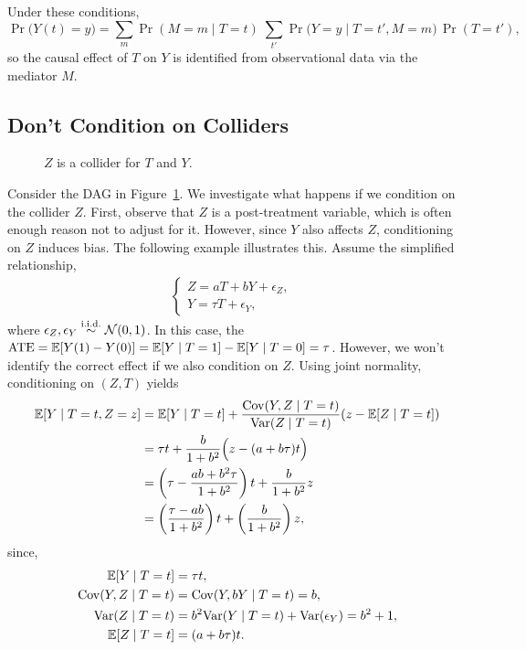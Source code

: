 \documentclass[11pt]{exam}
\begin{document}
Under these conditions,
\[
 \Pr\big(Y(t)=y\big)
= \sum_{m}  \Pr(M = m \mid T = t)\;\sum_{t'}  \Pr\big(Y = y \mid T = t', M = m\big)\, \Pr(T = t'),
\]
so the causal effect of $T$ on $Y$ is identified from observational data via the mediator $M$.

\subsection{Don't Condition on Colliders}

\begin{figure}[h!]
\centering
{}
\caption{$Z$ is a collider for $T$ and $Y$.}
\label{fig:collider}
\end{figure}

Consider the DAG in Figure~\ref{fig:collider}. We investigate what happens if we condition on the collider $Z$. First, observe that $Z$ is a post-treatment variable, which is often enough reason not to adjust for it. However, since $Y$ also affects $Z$, conditioning on $Z$ induces bias. The following example illustrates this. Assume the simplified relationship,
\begin{align*}
    \begin{cases}
        Z = a T + b Y + \epsilon_Z, & 
        \\
        Y = \tau T + \epsilon_Y, &
    \end{cases}
\end{align*}
where $\epsilon_Z, \epsilon_Y \overset{\text{i.i.d.}}{\sim} \mathcal{N}(0, 1)$.
In this case, the $\mathrm{ATE} = \mathbb{E}[Y(1) - Y(0)] = \mathbb{E}[Y \mid T = 1] - \mathbb{E}[Y \mid T = 0] = \tau$. However, we won't identify the correct effect if we also condition on $Z$.
\medskip
\noindent
Using joint normality, conditioning on $(Z, T)$ yields
\begin{align*}
    \mathbb{E}[Y \mid T = t, Z = z] &= \mathbb{E}[Y \mid T = t] + \frac{\mathrm{Cov}(Y, Z \mid T = t)}{\mathrm{Var}(Z \mid T = t)} (z - \mathbb{E}[Z \mid T = t])
    \\
    &= \tau t + \frac{b}{1 + b^2} \Big(z - (a+b\tau)t\Big)
    \\
    &= \left(\tau - \frac{ab + b^2\tau}{1 + b^2}\right)t + \frac{b}{1 + b^2} z
    \\
    &= \left(\frac{\tau - ab}{1 + b^2}\right)t + \left(\frac{b}{1 + b^2}\right) z,
\end{align*}
since,
\begin{align*}
    \mathbb{E}[Y \mid T = t] &= \tau t,
    \\
    \mathrm{Cov}(Y, Z \mid T = t) &= \mathrm{Cov}(Y, bY \mid T = t) = b,
    \\
    \mathrm{Var}(Z \mid T = t) &= b^2 \mathrm{Var}(Y \mid T = t) + \mathrm{Var}(\epsilon_Y) = b^2 + 1,
    \\
    \mathbb{E}[Z \mid T = t] &= (a + b\tau) t.
\end{align*}
\end{document}
